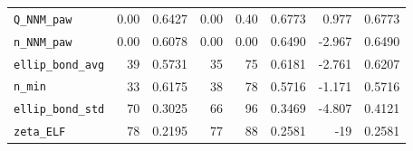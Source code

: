 \begin{table}[p]
\begin{tabular}{lrrrrrrr}
\texttt{Q\_NNM\_paw} & 0.00 & 0.6427 & 0.00 & 0.40 & 0.6773 & 0.977 & 0.6773 \\
\texttt{n\_NNM\_paw} & 0.00 & 0.6078 & 0.00 & 0.00 & 0.6490 & -2.967 & 0.6490 \\
\texttt{ellip\_bond\_avg} & 39 & 0.5731 & 35 & 75 & 0.6181 & -2.761 & 0.6207 \\
\texttt{n\_min} & 33 & 0.6175 & 38 & 78 & 0.5716 & -1.171 & 0.5716 \\
\texttt{ellip\_bond\_std} & 70 & 0.3025 & 66 & 96 & 0.3469 & -4.807 & 0.4121 \\
\texttt{zeta\_ELF} & 78 & 0.2195 & 77 & 88 & 0.2581 & -19 & 0.2581 \\
\bottomrule
\end{tabular}
\end{table}

